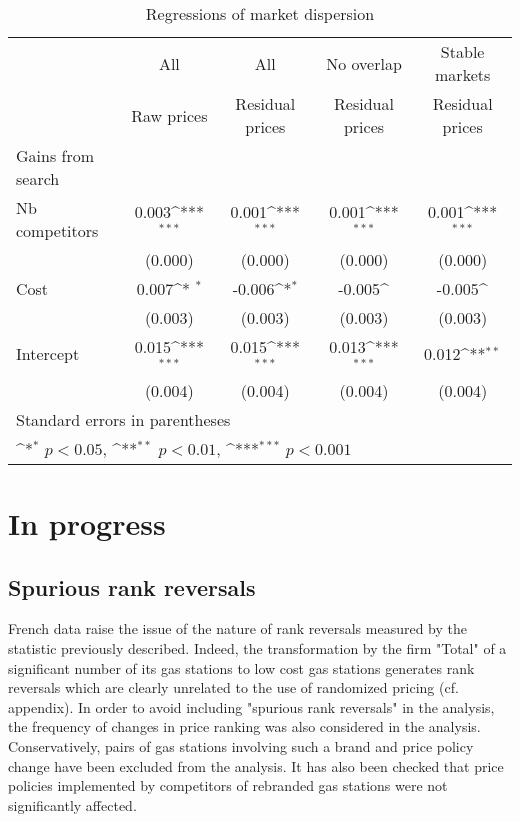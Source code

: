\documentclass[english]{article}
\begin{document}
\begin{table}[!h]
\def\sym#1{\ifmmode^{#1}\else\(^{#1}\)\fi}
\caption{Regressions of market dispersion}
\centering
\begin{tabular}{lcccc}
\hline
\hline
{} & All & All & No overlap & Stable markets\\
{} & Raw prices & Residual prices & Residual prices &  Residual prices \\
\hline
Gains from search & & & & \\
\hline
Nb competitors           &  0.003\sym{***}  &  0.001\sym{***}  &  0.001\sym{***}  & 0.001\sym{***} \\
{}                       & (0.000)          & (0.000)          & (0.000)          & (0.000)        \\
Cost                     &  0.007\sym{*  }  & -0.006\sym{*}    & -0.005\sym{}     & -0.005\sym{}   \\
{}                       & (0.003)          & (0.003)          & (0.003)          & (0.003)        \\
Intercept                &  0.015\sym{***}  &  0.015\sym{***}  & 0.013\sym{***}   &  0.012\sym{**} \\
{}                       & (0.004)          & (0.004)          & (0.004)          & (0.004)        \\
\hline
\hline\hline
\multicolumn{4}{l}{\footnotesize Standard errors in parentheses}\\
\multicolumn{4}{l}{\footnotesize \sym{*} \(p<0.05\), \sym{**} \(p<0.01\), \sym{***} \(p<0.001\)}\\
\end{tabular}
\end{table}

\newpage

\section{In progress}

\subsection{Spurious rank reversals}

French data raise the issue of the nature of rank reversals measured by the statistic previously described. Indeed, the transformation by the firm "Total" of a significant number of its gas stations to low cost gas stations generates rank reversals which are clearly unrelated to the use of randomized pricing (cf. appendix). In order to avoid including "spurious rank reversals" in the analysis, the frequency of changes in price ranking was also considered in the analysis. Conservatively, pairs of gas stations involving such a brand and price policy change have been excluded from the analysis. It has also been checked that price policies implemented by competitors of rebranded gas stations were not significantly affected.
\end{document}
